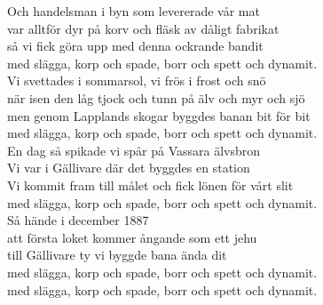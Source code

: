 \vspace{10pt}
Och handelsman i byn som levererade vår mat\\
var alltför dyr på korv och fläsk av dåligt fabrikat\\
så vi fick göra upp med denna ockrande bandit\\
med slägga, korp och spade, borr och spett och dynamit.\\
\vspace{10pt}
Vi svettades i sommarsol, vi frös i frost och snö\\
när isen den låg tjock och tunn på älv och myr och sjö\\
men genom Lapplands skogar byggdes banan bit för bit\\
med slägga, korp och spade, borr och spett och dynamit.\\
\vspace{10pt}
En dag så spikade vi spår på Vassara älvsbron\\
Vi var i Gällivare där det byggdes en station\\
Vi kommit fram till målet och fick lönen för vårt slit\\
med slägga, korp och spade, borr och spett och dynamit.\\
\vspace{10pt}
Så hände i december 1887\\
att första loket kommer ångande som ett jehu\\
till Gällivare ty vi byggde bana ända dit\\
med slägga, korp och spade, borr och spett och dynamit.\\
med slägga, korp och spade, borr och spett och dynamit.
